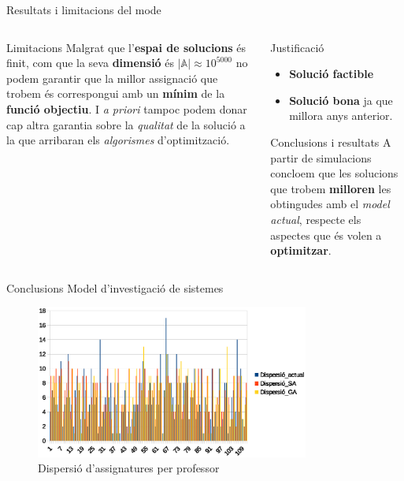 \documentclass[twocolumn]{beamer}
\begin{document}
\begin{frame}{Resultats i limitacions del mode}
\begin{columns}[t]
	\begin{column}{.5\textwidth}
		\begin{block}{Limitacions}
			Malgrat que l'\textbf{espai de solucions} és finit, com que la seva \textbf{dimensió} és $|\mathbb{A}|\approx10^{5000}$ no podem  garantir que la millor assignació que trobem és correspongui amb un  \textbf{mínim} de la \textbf{funció objectiu}. 
			I \textit{a priori} tampoc podem donar cap altra garantia sobre la \textit{qualitat} de la solució a la que arribaran els \textit{algorismes} d'optimització.
		\end{block}
		
	\end{column}
	\begin{column}{.5\textwidth}
		
		\begin{block}{Justificació}
			\begin{itemize}
				\item \textbf{Solució factible}
				\item \textbf{Solució bona} ja que millora anys anterior.
			\end{itemize}
		\end{block}
		\begin{block}{Conclusions i resultats}
			A partir de simulacions concloem que les solucions que trobem  \textbf{milloren} les obtingudes amb el \textit{model actual}, respecte els aspectes que és volen a \textbf{optimitzar}.
		\end{block}
	\end{column}
\end{columns}
\end{frame}
\begin{frame}{Conclusions Model d'investigació de sistemes}
\begin{figure}
	\includegraphics[width=9cm]{dispersio_diff_ga}
	\caption{Dispersió d'assignatures per professor}
\end{figure}
\end{frame}
\end{document}
